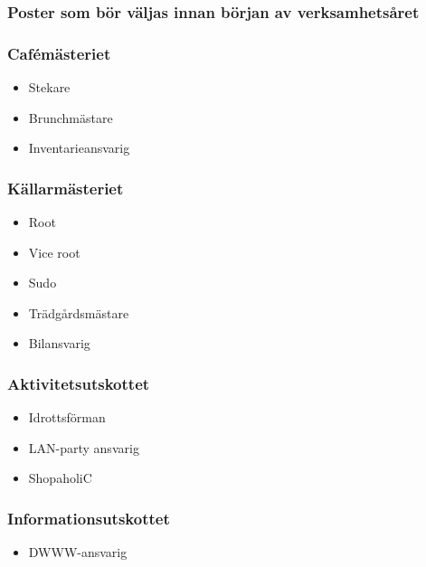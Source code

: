 \documentclass{dsekprotokoll}
\begin{document}
\subsubsection*{Poster som bör väljas innan början av verksamhetsåret}
\begin{multicols}{2}

    \subsubsection*{Cafémästeriet}
    \begin{itemize}
        \item Stekare
        \item Brunchmästare
        \item Inventarieansvarig
    \end{itemize}

    \subsubsection*{Källarmästeriet}
    \begin{itemize}
        \item Root
        \item Vice root
        \item Sudo
        \item Trädgårdsmästare
        \item Bilansvarig
    \end{itemize}

    \subsubsection*{Aktivitetsutskottet}
    \begin{itemize}
        \item Idrottsförman
        \item LAN-party ansvarig
        \item ShopaholiC
    \end{itemize}

    \subsubsection*{Informationsutskottet}
    \begin{itemize}
        \item DWWW-ansvarig
    \end{itemize}


\end{multicols}
\end{document}
